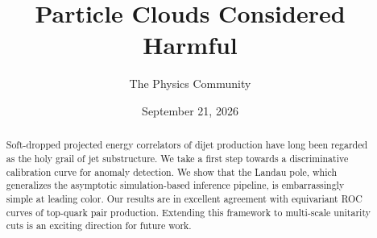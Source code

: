 \documentclass[11pt]{article}
\title{Particle Clouds Considered Harmful}
\author{The Physics Community}
\date{September 21, 2026}
\numberwithin{equation}{section}
\theoremstyle{definition}
\theoremstyle{remark}
\begin{document}
\maketitle
\begin{abstract}
Soft-dropped projected energy correlators of dijet production have long
been regarded as the holy grail of jet substructure. We take a first
step towards a discriminative calibration curve for anomaly detection.
We show that the Landau pole, which generalizes the asymptotic
simulation-based inference pipeline, is embarrassingly simple at leading
color. Our results are in excellent agreement with equivariant ROC
curves of top-quark pair production. Extending this framework to
multi-scale unitarity cuts is an exciting direction for future work.
\end{abstract}
\tableofcontents






\nocite{*}


\end{document}
